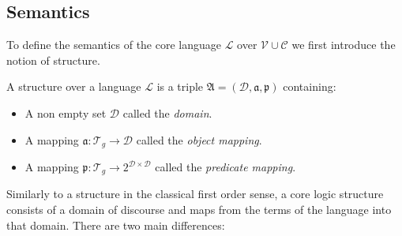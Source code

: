 \subsection{Semantics}
To define the semantics of the core language $\mathcal{L}$ over $\mathcal{V}\cup\mathcal{C}$ we first introduce the notion of structure. 

\begin{definition}[Structure]
A structure over a language $\mathcal{L}$ %
is a triple $\mathfrak{A}=(\mathcal{D}, \mathfrak{a}, \mathfrak{p})$ containing:
\begin{itemize}
 \item A non empty set $\mathcal{D}$ %
 called the \emph{domain}. %
 \item A mapping $\mathfrak{a}: \mathcal{T}_g\rightarrow \mathcal{D}$ 
 called the \emph{object mapping}.
 
\item A mapping $\mathfrak{p}: \mathcal{T}_g\rightarrow 2^{\mathcal{D}\times\mathcal{D}}$ called the \emph{predicate mapping}.  %
\end{itemize}
\end{definition}
Similarly to a structure in the classical first order sense, a core logic structure 
consists of a domain of discourse and maps from the terms of the language into that domain. There are two main differences:

